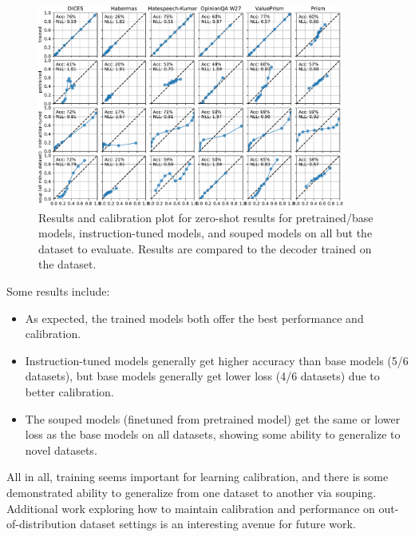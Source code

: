 \documentclass[11pt]{article}
\begin{document}
\begin{figure}[h]
\centering
\includegraphics[width=0.9\textwidth]{files/big_calibration.pdf}
\caption{Results and calibration plot for zero-shot results for pretrained/base models, instruction-tuned models, and souped models on all but the dataset to evaluate. Results are compared to the decoder trained on the dataset.}
\label{fig:bigcalibration}
\end{figure}


Some results include:
\begin{itemize}
\item As expected, the trained models both offer the best performance and calibration.
\item Instruction-tuned models generally get higher accuracy than base models (5/6 datasets), but base models generally get lower loss (4/6 datasets) due to better calibration.
\item The souped models (finetuned from pretrained model) get the same or lower loss as the base models on all datasets, showing some ability to generalize to novel datasets.
\end{itemize}

All in all, training seems important for learning calibration, and there is some demonstrated ability to generalize from one dataset to another via souping. Additional work exploring how to maintain calibration and performance on out-of-distribution dataset settings is an interesting avenue for future work.
\end{document}
